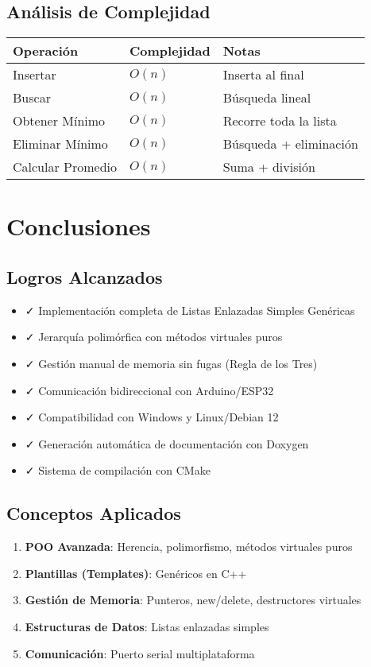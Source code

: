 \documentclass[12pt, spanish]{article}
\newcommand{\secc}[1]{\section{#1}\vspace{0.3cm}}
\begin{document}
\subsection{Análisis de Complejidad}

\begin{center}
\begin{tabularx}{\textwidth}{|X|X|X|}
\hline
\textbf{Operación} & \textbf{Complejidad} & \textbf{Notas} \\
\hline
Insertar & $O(n)$ & Inserta al final \\
\hline
Buscar & $O(n)$ & Búsqueda lineal \\
\hline
Obtener Mínimo & $O(n)$ & Recorre toda la lista \\
\hline
Eliminar Mínimo & $O(n)$ & Búsqueda + eliminación \\
\hline
Calcular Promedio & $O(n)$ & Suma + división \\
\hline
\end{tabularx}
\end{center}

\secc{Conclusiones}

\subsection{Logros Alcanzados}

\begin{itemize}
    \item ✓ Implementación completa de Listas Enlazadas Simples Genéricas
    \item ✓ Jerarquía polimórfica con métodos virtuales puros
    \item ✓ Gestión manual de memoria sin fugas (Regla de los Tres)
    \item ✓ Comunicación bidireccional con Arduino/ESP32
    \item ✓ Compatibilidad con Windows y Linux/Debian 12
    \item ✓ Generación automática de documentación con Doxygen
    \item ✓ Sistema de compilación con CMake
\end{itemize}

\subsection{Conceptos Aplicados}

\begin{enumerate}
    \item \textbf{POO Avanzada}: Herencia, polimorfismo, métodos virtuales puros
    \item \textbf{Plantillas (Templates)}: Genéricos en C++
    \item \textbf{Gestión de Memoria}: Punteros, new/delete, destructores virtuales
    \item \textbf{Estructuras de Datos}: Listas enlazadas simples
    \item \textbf{Comunicación}: Puerto serial multiplataforma
\end{enumerate}
\end{document}
